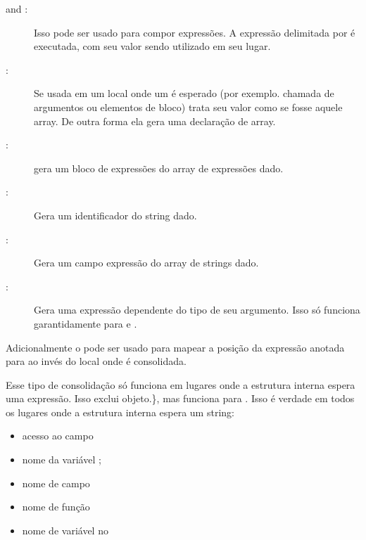 \begin{description}
   	\item[\expr{\$\{\}} and :]  Isso pode ser usado para compor expressões. A expressão delimitada por \expr{\{ \}} é executada, com seu valor sendo utilizado em seu lugar.
    \item[:]  Se usada em um local onde um  é esperado (por exemplo. chamada de argumentos ou elementos de bloco)   trata seu valor como se fosse aquele array. De outra forma ela gera uma declaração de array.
    \item[:]   gera um bloco de expressões do array de expressões dado.
    \item[:] Gera um identificador do string dado.
	\item[:]  Gera um campo expressão do array de strings dado.
    \item[:]  Gera uma expressão dependente do tipo de seu argumento. Isso só funciona garantidamente para  e .
\end{description}

Adicionalmente o   pode ser usado para mapear a posição da expressão anotada para  ao invés do local onde é consolidada. 

Esse tipo de consolidação só funciona em lugares onde a estrutura interna espera uma expressão. Isso exclui objeto.\}, mas funciona para . Isso é verdade em todos os lugares onde a estrutura interna espera um string:

\begin{itemize}
    \item acesso ao campo 
    \item nome da variável ;
\end{itemize}
\begin{itemize}
	\item nome de campo  
    \item nome de função 
    \item nome de variável no 
\end{itemize}


